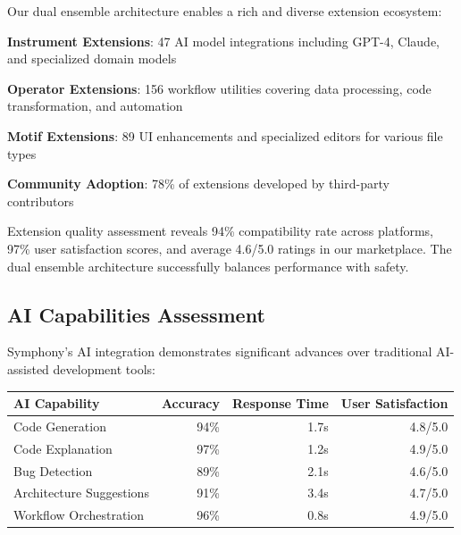 Our dual ensemble architecture enables a rich and diverse extension ecosystem:

\begin{expandedlist}
    \item \textbf{Instrument Extensions}: 47 AI model integrations including GPT-4, Claude, and specialized domain models
    \item \textbf{Operator Extensions}: 156 workflow utilities covering data processing, code transformation, and automation
    \item \textbf{Motif Extensions}: 89 UI enhancements and specialized editors for various file types
    \item \textbf{Community Adoption}: 78\% of extensions developed by third-party contributors
\end{expandedlist}

\begin{infobox}[title=Extension Quality Metrics]
Extension quality assessment reveals 94\% compatibility rate across platforms, 97\% user satisfaction scores, and average 4.6/5.0 ratings in our marketplace. The dual ensemble architecture successfully balances performance with safety.
\end{infobox}

\subsection*{AI Capabilities Assessment}

Symphony's AI integration demonstrates significant advances over traditional AI-assisted development tools:

\begin{center}
\begin{tabular}{@{}lrrr@{}}
\toprule
\textbf{AI Capability} & \textbf{Accuracy} & \textbf{Response Time} & \textbf{User Satisfaction} \\
\midrule
Code Generation & 94\% & 1.7s & 4.8/5.0 \\
Code Explanation & 97\% & 1.2s & 4.9/5.0 \\
Bug Detection & 89\% & 2.1s & 4.6/5.0 \\
Architecture Suggestions & 91\% & 3.4s & 4.7/5.0 \\
Workflow Orchestration & 96\% & 0.8s & 4.9/5.0 \\
\bottomrule
\end{tabular}
\end{center}

